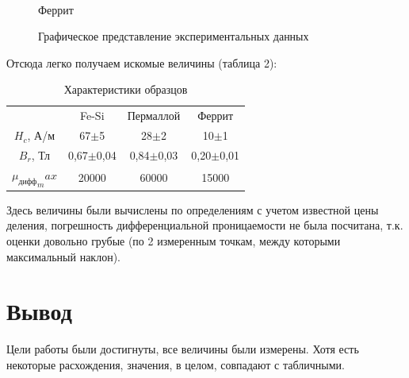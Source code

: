 \documentclass[12pt,a4paper]{article}
\begin{document}
\begin{figure}[h]
\begin{minipage}[h]{0.31\linewidth}
 \\Феррит
\end{minipage}
\caption{Графическое представление экспериментальных данных}
\end{figure}
Отсюда легко получаем искомые величины (таблица 2):
\begin{table}[h]\centering
\begin{tabular}{c|c|c|c|}
~&Fe-Si&Пермаллой&Феррит\\
$H_c$, А/м&67$\pm$5&28$\pm$2&10$\pm$1\\
\hline
$B_r$, Тл&0,67$\pm$0,04&0,84$\pm$0,03&0,20$\pm$0,01\\
\hline
${\mu_\text{дифф}}_max$&20000&60000&15000\\
\hline
\end{tabular}
\caption{Характеристики образцов}
\end{table}
Здесь величины были вычислены по определениям с учетом известной цены деления, погрешность дифференциальной проницаемости не была посчитана, т.к. оценки довольно грубые (по 2 измеренным точкам, между которыми максимальный наклон).
\section{Вывод}
Цели работы были достигнуты, все величины были измерены. Хотя есть некоторые расхождения, значения, в целом, совпадают с табличными.
\end{document}
